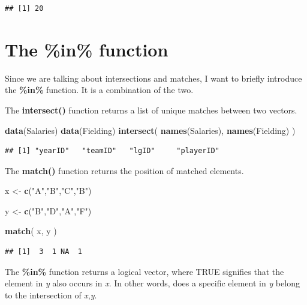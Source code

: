 \documentclass[]{book}
\newenvironment{Shaded}{\begin{snugshade}}{\end{snugshade}}
\newcommand{\KeywordTok}[1]{\textcolor[rgb]{0.13,0.29,0.53}{\textbf{#1}}}
\newcommand{\NormalTok}[1]{#1}
\newcommand{\StringTok}[1]{\textcolor[rgb]{0.31,0.60,0.02}{#1}}
\theoremstyle{definition}
\theoremstyle{definition}
\theoremstyle{definition}
\theoremstyle{remark}
\begin{document}
\begin{verbatim}
## [1] 20
\end{verbatim}

\hypertarget{the-in-function}{%
\section{The \%in\% function}\label{the-in-function}}

Since we are talking about intersections and matches, I want to briefly
introduce the \textbf{\%in\%} function. It is a combination of the two.

The \textbf{intersect()} function returns a list of unique matches
between two vectors.

\begin{Shaded}
\begin{Highlighting}[]
\KeywordTok{data}\NormalTok{(Salaries)}
\KeywordTok{data}\NormalTok{(Fielding)}
\KeywordTok{intersect}\NormalTok{( }\KeywordTok{names}\NormalTok{(Salaries), }\KeywordTok{names}\NormalTok{(Fielding) )}
\end{Highlighting}
\end{Shaded}

\begin{verbatim}
## [1] "yearID"   "teamID"   "lgID"     "playerID"
\end{verbatim}

The \textbf{match()} function returns the position of matched elements.

\begin{Shaded}
\begin{Highlighting}[]
\NormalTok{x <-}\StringTok{ }\KeywordTok{c}\NormalTok{(}\StringTok{"A"}\NormalTok{,}\StringTok{"B"}\NormalTok{,}\StringTok{"C"}\NormalTok{,}\StringTok{"B"}\NormalTok{)}

\NormalTok{y <-}\StringTok{ }\KeywordTok{c}\NormalTok{(}\StringTok{"B"}\NormalTok{,}\StringTok{"D"}\NormalTok{,}\StringTok{"A"}\NormalTok{,}\StringTok{"F"}\NormalTok{)}

\KeywordTok{match}\NormalTok{( x, y )}
\end{Highlighting}
\end{Shaded}

\begin{verbatim}
## [1]  3  1 NA  1
\end{verbatim}

The \textbf{\%in\%} function returns a logical vector, where TRUE
signifies that the element in \emph{y} also occurs in \emph{x}. In other
words, does a specific element in \emph{y} belong to the intersection of
\emph{x},\emph{y}.
\end{document}
